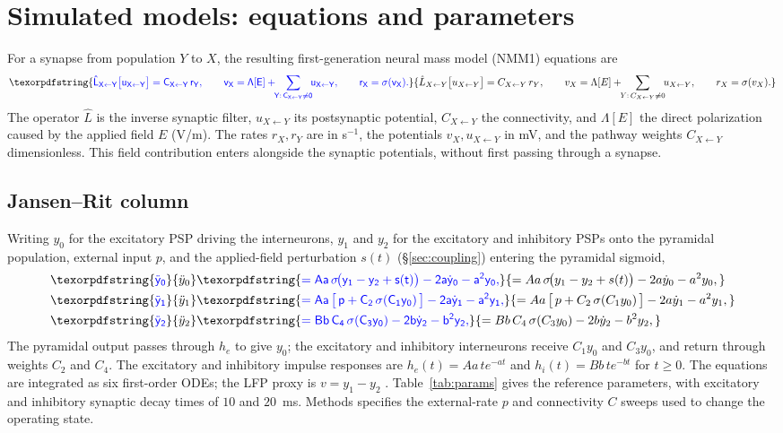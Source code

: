 \documentclass[11pt,a4paper]{article}
\newcommand{\Sig}{\sigma}
\providecommand{\DIFaddtex}[1]{{\protect\color{blue} \sf #1}} %
\providecommand{\DIFaddbegin}{} %
\providecommand{\DIFadd}[1]{\texorpdfstring{\DIFaddtex{#1}}{#1}} %
\begin{document}
\DIFaddbegin \renewcommand{\theequation}{B\arabic{equation}}
\renewcommand{\theHequation}{appendixB.\arabic{equation}}
\setcounter{equation}{0}
\clearpage
\section{\DIFadd{Simulated models: equations and parameters}}\label{app:models}
\DIFadd{For a synapse from population $Y$ to $X$, the resulting first-generation neural
mass model (NMM1) equations are
\cite{ruffini2025rosetta}
}\begin{equation}
\DIFadd{\hat L_{X\leftarrow Y}\big[u_{X\leftarrow Y}\big]=C_{X\leftarrow Y}\,r_Y,\qquad
v_X=\Lambda[E]+\!\!\sum_{Y:\,C_{X\leftarrow Y}\neq0}\!\!u_{X\leftarrow Y},\qquad
r_X=\Sig(v_X).
\label{eq:nmm1}
}\end{equation}
\DIFadd{The operator $\hat L$ is the inverse synaptic filter, $u_{X\leftarrow Y}$ its
postsynaptic potential, $C_{X\leftarrow Y}$ the connectivity, and $\Lambda[E]$
the direct polarization caused by the applied field $E$ (V/m). The rates $r_X,r_Y$
are in s$^{-1}$, the potentials $v_X,u_{X\leftarrow Y}$ in mV, and the
pathway weights $C_{X\leftarrow Y}$ dimensionless. This field contribution enters
alongside the synaptic potentials, without first passing through a synapse.
}

\subsection*{\DIFadd{Jansen--Rit column}}
\DIFadd{Writing $y_0$ for the excitatory PSP driving the interneurons, $y_1$ and $y_2$ for the
excitatory and inhibitory PSPs onto the pyramidal population, external input $p$, and the
applied-field perturbation $s(t)$ (\S\ref{sec:coupling}) entering the pyramidal sigmoid,
}\begin{align}
\DIFadd{\ddot y_0 }&\DIFadd{= Aa\,\Sig\!\big(y_1-y_2+s(t)\big)-2a\dot y_0-a^2 y_0, \label{eq:jr0}}\\
\DIFadd{\ddot y_1 }&\DIFadd{= Aa\,\big[\,p+C_2\,\Sig(C_1 y_0)\,\big]-2a\dot y_1-a^2 y_1,}\\
\DIFadd{\ddot y_2 }&\DIFadd{= Bb\,C_4\,\Sig(C_3 y_0)-2b\dot y_2-b^2 y_2,
}\end{align}
\DIFadd{The pyramidal output passes through $h_e$ to give $y_0$; the excitatory
and inhibitory interneurons receive $C_1y_0$ and $C_3y_0$, and return through
weights $C_2$ and $C_4$. The excitatory and inhibitory impulse responses are
$h_e(t)=Aa\,t e^{-at}$ and $h_i(t)=Bb\,t e^{-bt}$ for $t\ge0$.
The equations are integrated as six first-order ODEs; the LFP proxy is $v=y_1-y_2$ \cite{jansen1995}.
Table~\ref{tab:params} gives the reference parameters, with excitatory and
inhibitory synaptic decay times of $10$ and $20$~ms. Methods specifies the
external-rate $p$ and connectivity $C$ sweeps used to change the operating state.
}
\end{document}
